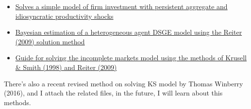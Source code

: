 \begin{itemize}
\item \href{https://github.com/jeromematthewcelestine/hetagentsaggshocks}{Solves a simple model of firm investment with persistent aggregate and idiosyncratic productivity shocks}
\item \href{https://github.com/jeromematthewcelestine/hetagentsaggshocks}{Bayesian estimation of a heterogeneous agent DSGE model using the Reiter (2009) solution method}
\item \href{https://github.com/sebgraves/KS_and_Reiter}{Guide for solving the incomplete markets model using the methods of Krusell \& Smith (1998) and Reiter (2009)}
\end{itemize}

There's also a recent revised method on solving KS model by Thomas Winberry (2016), and I attach  the related files, in the future, I will learn about this methods.  